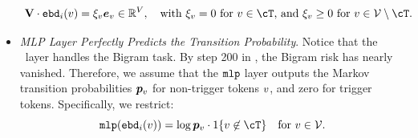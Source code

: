 \begin{itemize}[leftmargin=2em]
\begin{equation}
\begin{aligned}
&~ \bV \cdot \embd_i(\tok)  = \xi_\tok \bm{e}_\tok \in \R^{V},  ~~~\text{with $\xi_\tok=0$ for $\tok\in\cT$, and $\xi_\tok\geq 0$ for $\tok\in\vocab\setminus\cT$.} 
\end{aligned}
\end{equation}
\item \textit{MLP Layer Perfectly Predicts the Transition Probability}. Notice that the \mlp~layer handles the Bigram task. By step 200 in , the Bigram risk has nearly vanished. Therefore, we assume that the ${\tt mlp}$ layer outputs the Markov transition probabilities $\bm{p}_{v}$ for non-trigger tokens $v$, and zero for trigger tokens. Specifically, we restrict: 
\begin{equation}\label{eqn:simplification_TF_3}
\mlp(\embd_i(\tok)) = \log \bm{\transition}_v \cdot 1\{ \tok \not\in \cT  \} ~~~ \text{for } \tok \in \vocab. 
\end{equation}
\end{itemize}


